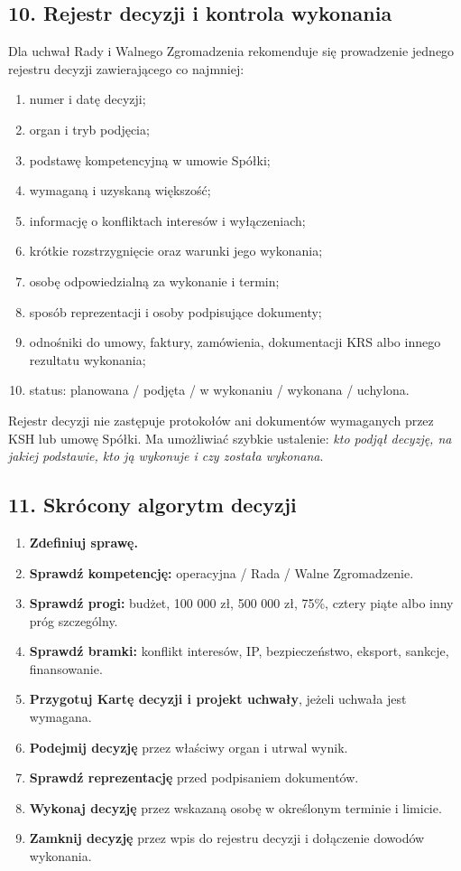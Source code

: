 \documentclass[12pt,a4paper]{report}
\begin{document}
\subsection*{10. Rejestr decyzji i kontrola wykonania}

Dla uchwał Rady i Walnego Zgromadzenia rekomenduje się prowadzenie jednego rejestru decyzji zawierającego co najmniej:
\begin{enumerate}
  \item numer i datę decyzji;
  \item organ i tryb podjęcia;
  \item podstawę kompetencyjną w umowie Spółki;
  \item wymaganą i uzyskaną większość;
  \item informację o konfliktach interesów i wyłączeniach;
  \item krótkie rozstrzygnięcie oraz warunki jego wykonania;
  \item osobę odpowiedzialną za wykonanie i termin;
  \item sposób reprezentacji i osoby podpisujące dokumenty;
  \item odnośniki do umowy, faktury, zamówienia, dokumentacji KRS albo innego rezultatu wykonania;
  \item status: planowana / podjęta / w wykonaniu / wykonana / uchylona.
\end{enumerate}

Rejestr decyzji nie zastępuje protokołów ani dokumentów wymaganych przez KSH lub umowę Spółki. Ma umożliwiać szybkie ustalenie: \textit{kto podjął decyzję, na jakiej podstawie, kto ją wykonuje i czy została wykonana}.

\subsection*{11. Skrócony algorytm decyzji}

\begin{enumerate}
  \item \textbf{Zdefiniuj sprawę.}
  \item \textbf{Sprawdź kompetencję:} operacyjna / Rada / Walne Zgromadzenie.
  \item \textbf{Sprawdź progi:} budżet, 100 000 zł, 500 000 zł, 75\%, cztery piąte albo inny próg szczególny.
  \item \textbf{Sprawdź bramki:} konflikt interesów, IP, bezpieczeństwo, eksport, sankcje, finansowanie.
  \item \textbf{Przygotuj Kartę decyzji i projekt uchwały}, jeżeli uchwała jest wymagana.
  \item \textbf{Podejmij decyzję} przez właściwy organ i utrwal wynik.
  \item \textbf{Sprawdź reprezentację} przed podpisaniem dokumentów.
  \item \textbf{Wykonaj decyzję} przez wskazaną osobę w określonym terminie i limicie.
  \item \textbf{Zamknij decyzję} przez wpis do rejestru decyzji i dołączenie dowodów wykonania.
\end{enumerate}
\end{document}
